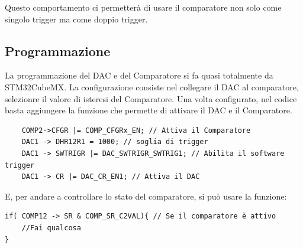Questo comportamento ci permetterà di usare il comparatore non solo come singolo trigger ma come doppio trigger.\\

\subsection{Programmazione}
La programmazione del DAC e del Comparatore si fa quasi totalmente da STM32CubeMX. La configurazione consiste nel collegare il DAC al comparatore, selezionre il valore di isteresi del Comparatore. Una volta configurato, nel codice basta aggiungere la funzione che permette di attivare il DAC e il Comparatore.\\

\begin{verbatim}
    COMP2->CFGR |= COMP_CFGRx_EN; // Attiva il Comparatore
    DAC1 -> DHR12R1 = 1000;	// soglia di trigger
	DAC1 -> SWTRIGR |= DAC_SWTRIGR_SWTRIG1; // Abilita il software trigger
	DAC1 -> CR |= DAC_CR_EN1; // Attiva il DAC
\end{verbatim}

E, per andare a controllare lo stato del comparatore, si può usare la funzione:

\begin{verbatim}
if( COMP12 -> SR & COMP_SR_C2VAL){ // Se il comparatore è attivo
    //Fai qualcosa
}
\end{verbatim}